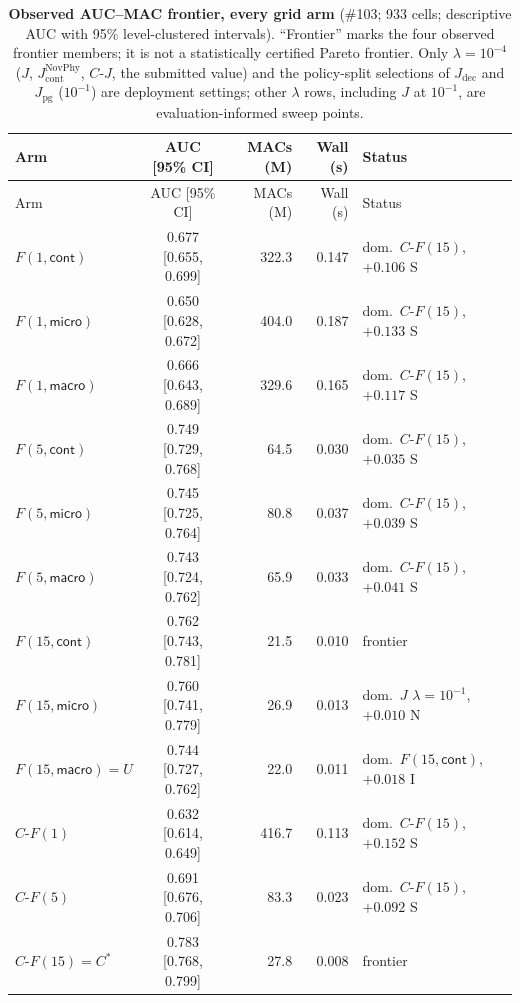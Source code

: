 {\footnotesize
\begin{revblock}
\setlength{\tabcolsep}{4pt}
\begin{longtable}{@{}lcrrl@{}}
\caption{\textbf{Observed AUC--MAC frontier, every grid arm} (\#103; 933 cells; descriptive AUC with 95\% level-clustered intervals). ``Frontier'' marks the four observed frontier members; it is not a statistically certified Pareto frontier. Only $\lambda=10^{-4}$ ($J$, $J_{\mathrm{cont}}^{\mathrm{NovPhy}}$, $C\text{-}J$, the submitted value) and the policy-split selections of $J_{\mathrm{dec}}$ and $J_{\mathrm{pg}}$ ($10^{-1}$) are deployment settings; other $\lambda$ rows, including $J$ at $10^{-1}$, are evaluation-informed sweep points.}\label{tab:app:res:frontier}\\
\toprule
Arm & AUC [95\% CI] & MACs (M) & Wall (s) & Status \\
\midrule
\endfirsthead
\toprule
Arm & AUC [95\% CI] & MACs (M) & Wall (s) & Status \\
\midrule
\endhead
\bottomrule
\endfoot
$F(1,\textsf{cont})$ & 0.677 [0.655, 0.699] & 322.3 & 0.147 & dom.\ $C\text{-}F(15)$, $+0.106$ S \\
$F(1,\textsf{micro})$ & 0.650 [0.628, 0.672] & 404.0 & 0.187 & dom.\ $C\text{-}F(15)$, $+0.133$ S \\
$F(1,\textsf{macro})$ & 0.666 [0.643, 0.689] & 329.6 & 0.165 & dom.\ $C\text{-}F(15)$, $+0.117$ S \\
$F(5,\textsf{cont})$ & 0.749 [0.729, 0.768] & 64.5 & 0.030 & dom.\ $C\text{-}F(15)$, $+0.035$ S \\
$F(5,\textsf{micro})$ & 0.745 [0.725, 0.764] & 80.8 & 0.037 & dom.\ $C\text{-}F(15)$, $+0.039$ S \\
$F(5,\textsf{macro})$ & 0.743 [0.724, 0.762] & 65.9 & 0.033 & dom.\ $C\text{-}F(15)$, $+0.041$ S \\
$F(15,\textsf{cont})$ & 0.762 [0.743, 0.781] & 21.5 & 0.010 & frontier \\
$F(15,\textsf{micro})$ & 0.760 [0.741, 0.779] & 26.9 & 0.013 & dom.\ $J$ $\lambda{=}10^{-1}$, $+0.010$ N \\
$F(15,\textsf{macro})=U$ & 0.744 [0.727, 0.762] & 22.0 & 0.011 & dom.\ $F(15,\textsf{cont})$, $+0.018$ I \\
$C\text{-}F(1)$ & 0.632 [0.614, 0.649] & 416.7 & 0.113 & dom.\ $C\text{-}F(15)$, $+0.152$ S \\
$C\text{-}F(5)$ & 0.691 [0.676, 0.706] & 83.3 & 0.023 & dom.\ $C\text{-}F(15)$, $+0.092$ S \\
$C\text{-}F(15)=C^{*}$ & 0.783 [0.768, 0.799] & 27.8 & 0.008 & frontier \\

\end{longtable}
\end{revblock}}
